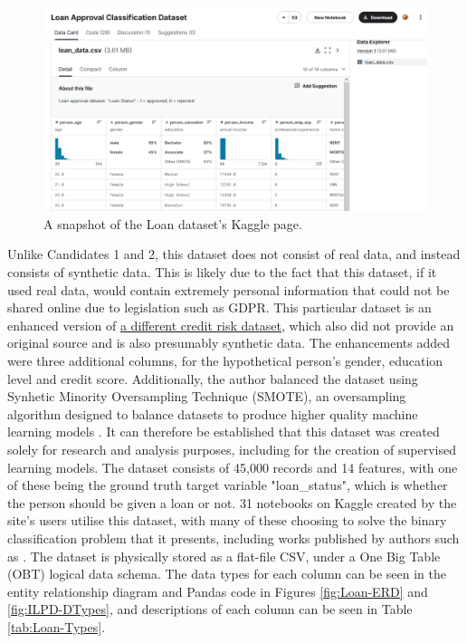 \documentclass[12pt]{report}
\begin{document}
\begin{figure}[H]
    \centering
    \includegraphics[width=.75\linewidth]{Loan-Kaggle.png}
    \caption{A snapshot of the Loan dataset's Kaggle page.}
    \label{fig:Loan-Kaggle}
\end{figure}

Unlike Candidates 1 and 2, this dataset does not consist of real data, and 
instead consists of synthetic data. This is likely due to the fact that this dataset, if it used real data, would contain extremely personal 
information that could not be shared online due to legislation such as GDPR. This particular dataset is an enhanced version of \href{https://www.kaggle.com/datasets/laotse/credit-risk-dataset}{a different credit risk dataset},
which also did not provide an original source and is also presumably synthetic data. The enhancements added were three additional 
columns, for the hypothetical person's gender, education level and credit score. Additionally, the author balanced the dataset using 
Synhetic Minority Oversampling Technique (SMOTE), an oversampling algorithm designed to balance datasets to produce higher
quality machine learning models \autocite{microsoft_smote_2024}.
It can therefore be established that this dataset was created solely for research and analysis purposes, including 
for the creation of supervised learning models. The dataset consists of 45,000 records and 14 features, with 
one of these being the ground truth target variable "loan\_status", which is whether the person should be given a loan or not. 
31 notebooks on Kaggle created by the site's users utilise this dataset, with many of these choosing to solve the binary classification 
problem that it presents, including works published by authors such as \autocite{gupta_loanification_2021}. 
The dataset is physically stored as a flat-file CSV, under a One Big Table (OBT) logical data schema.
The data types for each column can be seen in the entity relationship diagram and Pandas code in Figures \ref{fig:Loan-ERD} and \ref{fig:ILPD-DTypes}, and 
descriptions of each column can be seen in Table \ref{tab:Loan-Types}.
\end{document}

